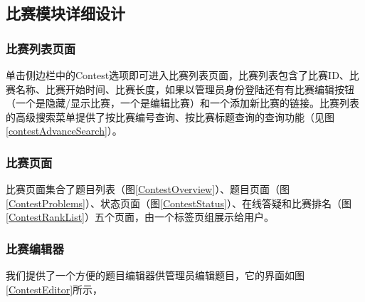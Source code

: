 
\subsection{比赛模块详细设计}
\subsubsection{比赛列表页面}

单击侧边栏中的Contest选项即可进入比赛列表页面，比赛列表包含了比赛ID、比赛名称、比赛开始时间、比赛长度，如果以管理员身份登陆还有有比赛编辑按钮（一个是隐藏/显示比赛，一个是编辑比赛）和一个添加新比赛的链接。比赛列表的高级搜索菜单提供了按比赛编号查询、按比赛标题查询的查询功能（见图\ref{contestAdvanceSearch}）。

\subsubsection{比赛页面}
比赛页面集合了题目列表（图\ref{ContestOverview}）、题目页面（图\ref{ContestProblems}）、状态页面（图\ref{ContestStatus}）、在线答疑和比赛排名（图\ref{ContestRankList}）五个页面，由一个标签页组展示给用户。


\subsubsection{比赛编辑器}
我们提供了一个方便的题目编辑器供管理员编辑题目，它的界面如图\ref{ContestEditor}所示，

